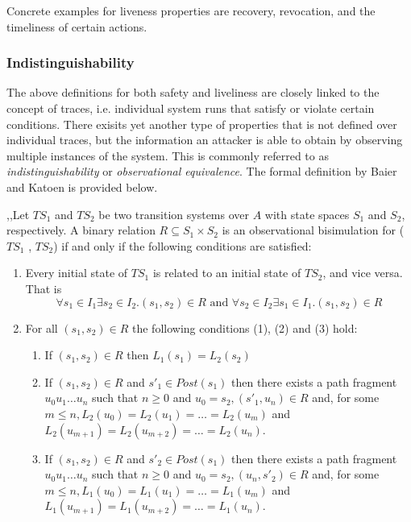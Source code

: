 Concrete examples for liveness properties are recovery, revocation, and the timeliness of certain actions.

\subsubsection{Indistinguishability}

The above definitions for both safety and liveliness are closely linked to the concept of traces, i.e. individual system runs that satisfy or violate certain conditions.
There exisits yet another type of properties that is not defined over individual traces, but the information an attacker is able to obtain by observing multiple instances of the system.
This is commonly referred to as \textit{indistinguishability} or \textit{observational equivalence}.
The formal definition by Baier and Katoen is provided below.

,,Let $TS_1$ and $TS_2$ be two transition systems over $A$ with state spaces $S_1$ and $S_2$, respectively.
A binary relation $R \subseteq S_1 \times S_2$ is an
observational bisimulation for ($TS_1$ , $TS_2$) if and only if the following conditions are satisfied:

\begin{enumerate}[label=(\Alph*)]
    \item Every initial state of $TS_1$ is related to an initial state of $TS_2$, and vice versa. That is
    \begin{equation*}
        \forall s_1 \in I_1 \exists s_2 \in I_2. (s_1, s_2) \in R \text{ and } \forall s_2 \in I_2 \exists s_1 \in I_1. (s_1, s_2) \in R
    \end{equation*}
    \item For all $(s_1, s_2) \in R$ the following conditions (1), (2) and (3) hold:
    \begin{enumerate}[label=(\arabic*)]
        \item If $(s_1, s_2) \in R$ then $L_1 (s_1) = L_2 (s_2)$
        \item If $(s_1, s_2) \in R$ and $s'_1 \in Post(s_1)$ then there exists a path fragment $u_0 u_1 \ldots u_n$ such that $n \geq 0$ and $u_0 = s_2, (s'_1, u_n) \in R$ and, for some $m \leq n, L_2(u_0) = L_2(u_1) = \ldots = L_2(u_m)$ and $L_2(u_{m+1}) = L_2(u_{m+2}) = \ldots = L_2(u_n)$.
        \item If $(s_1, s_2) \in R$ and $s'_2 \in Post(s_1)$ then there exists a path fragment $u_0 u_1 \ldots u_n$ such that $n \geq 0$ and $u_0 = s_2, (u_n, s'_2) \in R$ and, for some $m \leq n, L_1(u_0) = L_1(u_1) = \ldots = L_1 (u_m )$
and $L_1(u_{m+1}) = L_1(u_{m+2}) = \ldots = L_1 (u_n)$.
    \end{enumerate}
\end{enumerate}

